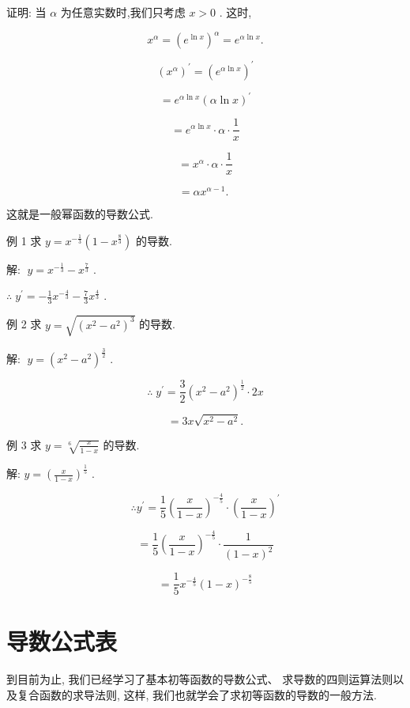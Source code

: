 \documentclass[lang=cn,newtx,10pt,scheme=chinese]{elegantbook}
\begin{document}
证明: 当 \(\alpha\) 为任意实数时,我们只考虑 \(x > 0\) . 这时,

\[
{x}^{\alpha } = {\left( {e}^{\ln x}\right) }^{\alpha } = {e}^{\alpha \ln x}.
\]

\[
{\left( {x}^{\alpha }\right) }^{\prime } = {\left( {e}^{\alpha \ln x}\right) }^{\prime }
\]

\[
= {e}^{\alpha \ln x}{\left( \alpha \ln x\right) }^{\prime }
\]

\[
= {e}^{\alpha \ln x} \cdot \alpha \cdot \frac{1}{x}
\]

\[
= {x}^{\alpha } \cdot \alpha \cdot \frac{1}{x}
\]

\[
= \alpha {x}^{\alpha - 1}\text{. }
\]

这就是一般幂函数的导数公式.

例 1 求 \(y = {x}^{-\frac{1}{3}}\left( {1 - {x}^{\frac{8}{3}}}\right)\) 的导数.

解: \(\;y = {x}^{-\frac{1}{3}} - {x}^{\frac{7}{3}}\) .

\(\therefore \;{y}^{\prime } = - \frac{1}{3}{x}^{-\frac{4}{3}} - \frac{7}{3}{x}^{\frac{4}{3}}\) .

例 2 求 \(y = \sqrt{{\left( {x}^{2} - {a}^{2}\right) }^{3}}\) 的导数.

解: \(\;y = {\left( {x}^{2} - {a}^{2}\right) }^{\frac{3}{2}}\) .

\[
\therefore \;{y}^{\prime } = \frac{3}{2}{\left( {x}^{2} - {a}^{2}\right) }^{\frac{1}{2}} \cdot {2x}
\]

\[
= {3x}\sqrt{{x}^{2} - {a}^{2}}\text{.}
\]

例 3 求 \(y = \sqrt[6]{\frac{x}{1 - x}}\) 的导数.

解: \(y = {\left( \frac{x}{1 - x}\right) }^{\frac{1}{5}}\) .

\[
\therefore {y}^{\prime } = \frac{1}{5}{\left( \frac{x}{1 - x}\right) }^{-\frac{4}{5}} \cdot {\left( \frac{x}{1 - x}\right) }^{\prime }
\]

\[
= \frac{1}{5}{\left( \frac{x}{1 - x}\right) }^{-\frac{4}{5}} \cdot \frac{1}{{\left( 1 - x\right) }^{2}}
\]

\[
= \frac{1}{5}{x}^{-\frac{4}{5}}{\left( 1 - x\right) }^{-\frac{8}{5}}
\]

\section*{导数公式表}

到目前为止, 我们已经学习了基本初等函数的导数公式、 求导数的四则运算法则以及复合函数的求导法则, 这样, 我们也就学会了求初等函数的导数的一般方法.
\end{document}
